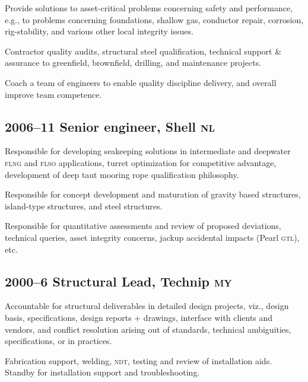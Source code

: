 
Provide solutions to asset-critical problems concerning safety and performance, e.g., to problems concerning foundations, shallow gas, conductor repair, corrosion, rig-stability, and various other local integrity issues.

Contractor quality audits, structural steel qualification, technical support \& assurance to greenfield, brownfield, drilling, and maintenance projects. %


Coach a team of engineers to enable quality discipline delivery, and overall improve team competence.


\subsection*{2006--11 Senior engineer, Shell \textsc{nl}} %
\label{sub:c4}

Responsible for developing seakeeping solutions in intermediate and deepwater \textsc{flng} and \textsc{flso} applications, turret optimization for competitive advantage, development of deep taut mooring rope qualification philosophy.

Responsible for concept development and maturation of gravity based structures, island-type structures, and steel structures.

Responsible for quantitative assessments and review of proposed deviations, technical queries, asset integrity concerns, jackup accidental impacts (Pearl \textsc{gtl}), etc.


\subsection*{2000--6 Structural Lead, Technip \textsc{my}} %
\label{sub:c5}

Accountable for structural deliverables in detailed design projects, viz., design basis, specifications, design reports + drawings, interface with clients and vendors, and conflict resolution arising out of standards, technical ambiguities, specifications, or in practices.

Fabrication support, welding, \textsc{ndt}, testing and review of installation aids. Standby for installation support and troubleshooting.


